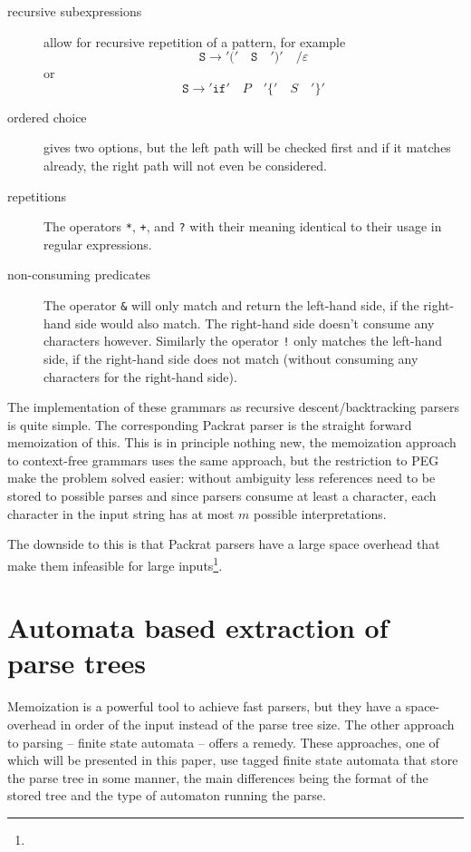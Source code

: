 \documentclass[11pt,a4paper,twoside,openright]{Thesis}
\theoremstyle{definition}
\newcommand{\seclabel}[1]{\label{sec:#1}}
\begin{document}
\begin{description}
  \item[recursive subexpressions] allow for recursive repetition of a
    pattern, for example
    \[\mathtt{S} \rightarrow \mathtt{'('}\quad \mathtt{S}\quad \mathtt{')'}\quad \mathtt{/} \varepsilon \]
    or
    \[ \mathtt{S} \rightarrow \mathtt{'if'}\quad P\quad \mathtt{'\{'}\quad S\quad \mathtt{'\}'}\]
  \item[ordered choice] gives two options, but the left path will be checked
    first and if it matches already, the right path will not even be considered.
  \item[repetitions] The operators \texttt{*}, \texttt{+}, and \texttt{?}
    with their meaning identical to their usage in regular expressions.
  \item[non-consuming predicates] The operator \texttt{\&} will only match and
    return the left-hand side, if the right-hand side would also match. The
    right-hand side doesn't consume any characters however. Similarly the
    operator \texttt{!} only matches the left-hand side, if the right-hand
    side does not match (without consuming any characters for the right-hand side).
\end{description}

The implementation of these grammars as recursive descent/backtracking
parsers is quite simple. The corresponding Packrat parser is the straight
forward memoization of this. This is in principle nothing new, the
memoization approach to context-free grammars uses the same approach, but the
restriction to PEG make the problem solved easier: without ambiguity less
references need to be stored to possible parses and since parsers consume at
least a character, each character in the input string has at most $m$
possible interpretations.

The downside to this is that Packrat parsers have a large space overhead that
make them infeasible for large
inputs\cite{Beck08a}\footnote{}.

\section{Automata based extraction of parse trees}\seclabel{parse-trees-related}
Memoization is a powerful tool to achieve fast parsers, but they have a
space-overhead in order of the input instead of the parse tree size. The
other approach to parsing -- finite state automata -- offers a remedy. These
approaches, one of which will be presented in this paper, use tagged finite
state automata that store the parse tree in some manner, the main differences
being the format of the stored tree and the type of automaton running the parse.
\end{document}
